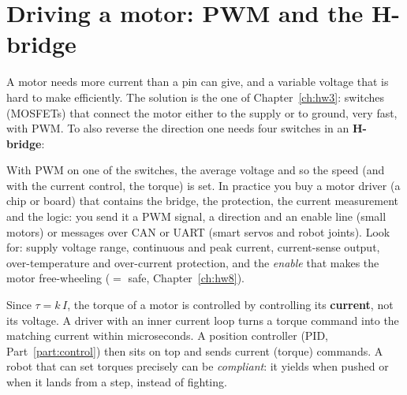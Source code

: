 \section*{Driving a motor: PWM and the H-bridge}
A motor needs more current than a pin can give, and a variable voltage that is hard to make efficiently. The solution is the one of Chapter~\ref{ch:hw3}: switches (MOSFETs) that connect the motor either to the supply or to ground, very fast, with PWM. To also reverse the direction one needs four switches in an \textbf{H-bridge}:
\begin{center}
\label{fig:hw6_h}
\end{center}
With PWM on one of the switches, the average voltage and so the speed (and with the current control, the torque) is set. In practice you buy a motor driver (a chip or board) that contains the bridge, the protection, the current measurement and the logic: you send it a PWM signal, a direction and an enable line (small motors) or messages over CAN or UART (smart servos and robot joints). Look for: supply voltage range, continuous and peak current, current-sense output, over-temperature and over-current protection, and the \emph{enable} that makes the motor free-wheeling ($=$ safe, Chapter~\ref{ch:hw8}).

\begin{keyidea}
Since $\tau=k\,I$, the torque of a motor is controlled by controlling its \textbf{current}, not its voltage. A driver with an inner current loop turns a torque command into the matching current within microseconds. A position controller (PID, Part~\ref{part:control}) then sits on top and sends current (torque) commands. A robot that can set torques precisely can be \emph{compliant}: it yields when pushed or when it lands from a step, instead of fighting.
\end{keyidea}

